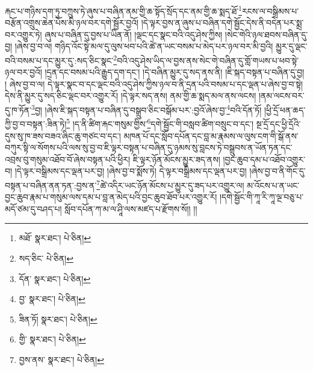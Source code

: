 རྐང་པ་གཉིས་དག་ཏུ་བཀྲུས་ཏེ་ཞུས་པ་བཞིན་ནམ་གྱི་ཆ་སྟོད་སྲོད་དང་ནམ་གྱི་ཆ་སྨད་ཐོ་\footnote{མཐོ་  སྣར་ཐང་།  པེ་ཅིན། }རངས་ལ་བསྒྲིམས་པ་བརྩོན་འགྲུས་ཆེན་པོས་མི་ཉལ་བར་དགེ་སྦྱོར་བྱའོ། །དེ་ལྟར་བྱས་ན་ཞུས་པ་བཞིན་དགེ་སྦྱོང་དེས་ནི་བདེན་པར་སྨྲ་བར་འགྱུར་ཏེ། ཞུས་པ་བཞིན་དུ་བྱས་པ་ཡིན་ནོ། །ལྡང་དང་སྣང་བའི་འདུ་ཤེས་ཀྱིས། །སེང་གེའི་ཉལ་ཐབས་བཞིན་དུ་བྱ། །ཞེས་བྱ་བ་ལ། གཉིད་འོང་སྟེ་མལ་དུ་ལུས་ཕབ་པའི་ཚེ་ན་ཡང་བསམ་པ་མེད་པར་ཉལ་བར་མི་བྱའི། མྱུར་དུ་ལྡང་བའི་བསམ་པ་དང་མྱུར་དུ་:སད་ཅིང་སྣང་\footnote{སད་ཅིང་  པེ་ཅིན། }བའི་འདུ་ཤེས་ཡིད་ལ་བྱས་ནས་སེང་གེ་བཞིན་དུ་གློ་གཡས་པ་ཕབ་སྟེ་ཉལ་བར་བྱའོ། །དྲན་དང་བསམ་པའི་རྒྱུད་དག་དང་། །དེ་བཞིན་མྱུར་དུ་སད་ནས་ནི། །ཇི་སྐད་བསྟན་པ་བཞིན་དུ་བྱ། །
ཞེས་བྱ་བ་ལ། དེ་ལྟར་སྣང་བ་དང་ལྡང་བའི་འདུ་ཤེས་ཀྱིས་ཉལ་བ་ནི་དྲན་པའི་བསམ་པ་དང་ལྡན་པ་ཞེས་བྱ་བ་སྟེ། དེས་ནི་མྱུར་དུ་སད་ཅིང་ལྡང་བར་འགྱུར་རོ། །དེ་ལྟར་སད་ནས། ནམ་གྱི་ཆ་སྨད་མལ་ནས་ལངས། །ནམ་ལངས་བར་དུ་ཁ་ཏོན་\footnote{དོན་  སྣར་ཐང་།  པེ་ཅིན། }བྱ། །ཞེས་ཇི་སྐད་བསྟན་པ་བཞིན་དུ་བསྒྲུབ་ཅིང་བསྒོམ་པར་:བྱའོ་ཞེས་བྱ་\footnote{བྱ་  སྣར་ཐང་།  པེ་ཅིན། }བའི་དོན་ཏོ། །ཕྱི་དྲོ་ཕན་ཆད་ཀྱི་བྱ་བ་བསྟན་:ཟིན་ཏེ།\footnote{ཟིན་ཏོ།  སྣར་ཐང་།  པེ་ཅིན། } །ད་ནི་ཚིག་རྐང་གསུམ་གྱིས་\footnote{གྱི་  སྣར་ཐང་།  པེ་ཅིན། }དགེ་སྦྱོང་གི་བསླབ་ཚིག་བསྲུང་བ་དང་། སྔ་དྲོ་དང་ཕྱི་དྲོའི་དུས་སུ་ཁ་ཟས་བཟའ་ཞིང་ཆུ་གཙང་བ་དང་། མཁན་པོ་དང་སློབ་དཔོན་དང་བླ་མ་རྣམས་ལ་ལུས་ངག་གི་སྒོ་ནས་བཀུར་སྟི་ལ་སོགས་པའི་ལས་སུ་བྱ་བ་ཇི་ལྟར་བསྟན་པ་བཞིན་དུ་ཉམས་སུ་བླངས་ཏེ་བསྒྲུབས་ན་ཡོན་ཏན་དང་འབྲས་བུ་གསུམ་འཐོབ་བོ་ཞེས་བསྟན་པའི་ཕྱིར། ཇི་ལྟར་ཉོན་མོངས་མྱུར་ཟད་ནས། །བྱང་ཆུབ་དམ་པ་འཐོབ་འགྱུར་བ། །དེ་ལྟར་བསྒྲིམས་དང་ལྡན་པར་བྱ། །ཞེས་བྱ་བ་སྨོས་ཏེ། དེ་ལྟར་བསྒྲིམས་དང་ལྡན་པར་བྱ། །ཞེས་བྱ་བ་ནི་གོང་དུ་བསྟན་པ་བཞིན་ནན་ཏན་:བྱས་ན་\footnote{བྱས་ནས་  སྣར་ཐང་།  པེ་ཅིན། }ཚེ་འདིར་ཡང་ཉོན་མོངས་པ་མྱུར་དུ་ཟད་པར་འགྱུར་ལ། མ་འོངས་པ་ན་ཡང་བྱང་ཆུབ་རྣམ་པ་གསུམ་ལས་དམ་པ་བླ་ན་མེད་པའི་བྱང་ཆུབ་ཐོབ་པར་འགྱུར་རོ། །དགེ་སྦྱོང་གི་ཀཱ་རི་ཀཱ་ལྔ་བཅུ་པ་མདོ་ཙམ་དུ་བཤད་པ། སློབ་དཔོན་ཀ་མ་ལ་ཤཱི་ལས་མཛད་པ་རྫོགས་སོ།། །།